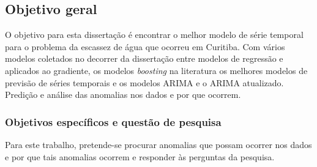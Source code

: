 \subsection{Objetivo geral} \label{subsec:objetivos}

 
O objetivo para esta dissertação é encontrar o melhor modelo de série temporal para o problema da escassez de água que ocorreu em Curitiba. Com vários modelos coletados no decorrer da dissertação entre modelos de regressão e aplicados ao gradiente, os modelos \textit{boosting} na literatura os melhores modelos de previsão de séries temporais e os modelos ARIMA e o ARIMA atualizado. Predição e análise das anomalias nos dados e por que ocorrem.
    
    
    \subsubsection{Objetivos espec\'ificos e quest\~ao de pesquisa} \label{subsubsec:obespec}
    
Para este trabalho, pretende-se procurar anomalias que possam ocorrer nos dados e por que tais anomalias ocorrem e responder às perguntas da pesquisa.

